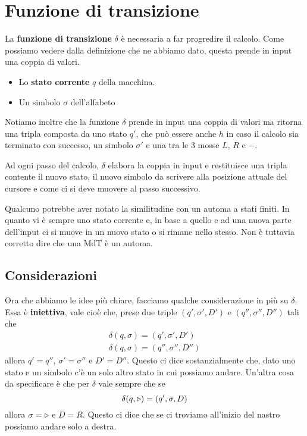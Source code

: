\section{Funzione di transizione}
La \textbf{funzione di transizione} $\delta$ è necessaria a
far progredire il calcolo. Come possiamo vedere dalla
definizione che ne abbiamo dato, questa prende in input una
coppia di valori.
\begin{itemize}
	\item Lo \textbf{stato corrente} $q$ della macchina.
	\item Un simbolo $\sigma$ dell'alfabeto
\end{itemize}

Notiamo inoltre che la funzione $\delta$ prende in input una
coppia di valori ma ritorna una tripla composta da uno stato
$q'$, che può essere anche $h$ in caso il calcolo sia terminato
con successo, un simbolo $\sigma'$ e una tra le 3 mosse $L$,
$R$ e $-$.

Ad ogni passo del calcolo, $\delta$ elabora la coppia in input
e restituisce una tripla contente il nuovo stato, il nuovo
simbolo da scrivere alla posizione attuale del cursore e come
ci si deve muovere al passo successivo.

Qualcuno potrebbe aver notato la similitudine con un automa a
stati finiti. In quanto vi è sempre uno stato corrente e, in
base a quello e ad una nuova parte dell'input ci si muove in
un nuovo stato o si rimane nello stesso. Non è tuttavia
corretto dire che una MdT è un automa.

\subsection{Considerazioni}
Ora che abbiamo le idee più chiare, facciamo qualche
considerazione in più su $\delta$. Essa è \textbf{iniettiva},
vale cioè che, prese due triple $(q', \sigma', D')$ e
$(q'', \sigma'', D'')$ tali che
\begin{gather*}
	\delta (q, \sigma) =  (q', \sigma', D') \\
	\delta (q, \sigma) = (q'', \sigma'', D'')
\end{gather*}
allora $q' = q''$, $\sigma' = \sigma''$ e $D' = D''$.
Questo ci dice sostanzialmente che, dato uno stato e un simbolo
c'è un solo altro stato in cui possiamo andare. Un'altra cosa
da specificare è che per $\delta$ vale sempre che se
\[ \delta(q, \triangleright) = (q', \sigma, D) \]
allora $\sigma = \triangleright$ e $D = R$. Questo ci dice che se ci
troviamo all'inizio del nastro possiamo andare solo a destra.

